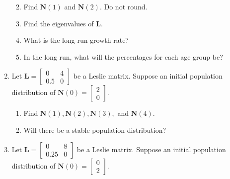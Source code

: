 \documentclass[
]{book}
\providecommand{\tightlist}{%
  \setlength{\itemsep}{0pt}\setlength{\parskip}{0pt}}
\theoremstyle{definition}
\theoremstyle{definition}
\theoremstyle{definition}
\theoremstyle{definition}
\theoremstyle{remark}
\begin{document}
\begin{enumerate}
  \begin{enumerate}
  \def\labelenumii{\alph{enumii}.}
  \tightlist
  \item
    Find \(\mathbf{N}(1)\) and \(\mathbf{N}(2).\) Do not round.
  \item
    Find the eigenvalues of \(\mathbf{L}.\)
  \item
    What is the long-run growth rate?
  \item
    In the long run, what will the percentages for each age group be?
  \end{enumerate}
\item
  Let \(\mathbf{L}=\begin{bmatrix} 0 & 4\\ 0.5 & 0\end{bmatrix}\) be a Leslie matrix. Suppose an initial population distribution of \(\mathbf{N}(0)=\begin{bmatrix}2\\0\end{bmatrix}.\)

  \begin{enumerate}
  \def\labelenumii{\alph{enumii}.}
  \tightlist
  \item
    Find \(\mathbf{N}(1), \mathbf{N}(2), \mathbf{N}(3),\) and \(\mathbf{N}(4).\)
  \item
    Will there be a stable population distribution?
  \end{enumerate}
\item
  Let \(\mathbf{L}=\begin{bmatrix} 0 & 8\\ 0.25 & 0\end{bmatrix}\) be a Leslie matrix. Suppose an initial population distribution of \(\mathbf{N}(0)=\begin{bmatrix}0\\2\end{bmatrix}.\)


\end{enumerate}
\end{document}
